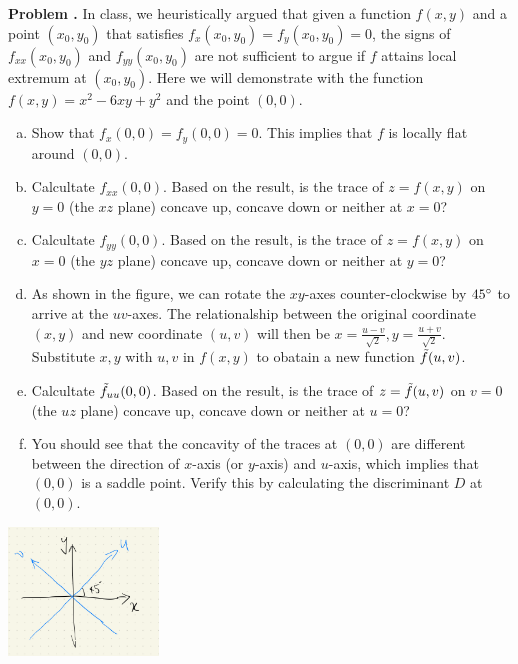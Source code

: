 \documentclass[11pt,letterpaper]{article}
\newcounter{problem}
\newcommand{\problem}{
	\stepcounter{problem}%
	\noindent \textbf{Problem \theproblem. }%
}
\begin{document}
\problem In class, we heuristically argued that given a function $f(x,y)$ and a point $(x_0, y_0)$ that satisfies $f_x(x_0, y_0) = f_y(x_0, y_0) = 0$, the signs of $f_{xx}(x_0,y_0)$ and $f_{yy}(x_0,y_0)$ are not sufficient to argue if $f$ attains local extremum at $(x_0, y_0)$.  Here we will demonstrate with the function $f(x, y) = x^2 - 6xy + y^2$ and the point $(0,0)$.
\begin{enumerate}[a)]
	\item Show that $f_x(0,0) = f_y(0,0) = 0$.  This implies that $f$ is locally flat around $(0,0)$.
	\item Calcultate $f_{xx}(0,0)$.  Based on the result, is the trace of $z = f(x,y)$ on $y=0$ (the $xz$ plane) concave up, concave down or neither at $x = 0$?
	\item Calcultate $f_{yy}(0,0)$.  Based on the result, is the trace of $z = f(x,y)$ on $x=0$ (the $yz$ plane) concave up, concave down or neither at $y = 0$?
	\item As shown in the figure, we can rotate the $xy$-axes counter-clockwise by $45\degree$ to arrive at the $uv$-axes.  The relationalship between the original coordinate $(x,y)$ and new coordinate $(u,v)$ will then be $x = \frac{u-v}{\sqrt{2}}, y = \frac{u+v}{\sqrt{2}}$.  Substitute $x, y$ with $u, v$ in $f(x,y)$ to obatain a new function $\Tilde{f}(u,v)$.
	\item Calcultate $\Tilde{f}_{uu}(0,0)$.  Based on the result, is the trace of $z = \Tilde{f}(u,v)$ on $v=0$ (the $uz$ plane) concave up, concave down or neither at $u = 0$?
	\item You should see that the concavity of the traces at $(0,0)$ are different between the direction of $x$-axis (or $y$-axis) and $u$-axis, which implies that $(0,0)$ is a saddle point.  Verify this by calculating the discriminant $D$ at $(0,0)$.
\end{enumerate}

\begin{center}
    \includegraphics[width = 0.3\textwidth]{../graph/A13.png}
\end{center}
\end{document}
